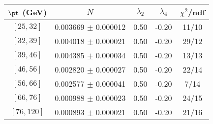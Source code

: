 \begin{tabular}{c||c|c|c|c}
$\pt$ (GeV) & $N$ & $\lambda_{2}$ & $\lambda_4$  & $\chi^2$/ndf  \\
\hline
$[25, 32]$ & 0.003669 $\pm$ 0.000012 & 0.50 & -0.20 & 11/10\\
$[32, 39]$ & 0.004018 $\pm$ 0.000021 & 0.50 & -0.20 & 29/12\\
$[39, 46]$ & 0.004385 $\pm$ 0.000034 & 0.50 & -0.20 & 13/13\\
$[46, 56]$ & 0.002820 $\pm$ 0.000027 & 0.50 & -0.20 & 22/14\\
$[56, 66]$ & 0.002577 $\pm$ 0.000041 & 0.50 & -0.20 & 7/14\\
$[66, 76]$ & 0.000988 $\pm$ 0.000023 & 0.50 & -0.20 & 24/15\\
$[76, 120]$ & 0.000893 $\pm$ 0.000021 & 0.50 & -0.20 & 21/16\\
\end{tabular}
